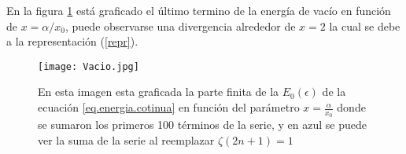 En la figura \ref{fig:vacio} está graficado el último termino de la energía de vacío en función de $x = \alpha / x_0$, puede observarse una divergencia alrededor de $x=2$ la cual se debe a la representación (\ref{repr}).

\begin{figure}
    \centering
    \texttt{[image: Vacio.jpg]}
    \caption{En esta imagen esta graficada la parte finita de la $E _0 (\epsilon) $ de la ecuación \ref{eq.energia.cotinua} en función del parámetro $x= \frac{\alpha}{x _0}$ donde se sumaron los primeros 100 términos de la serie, y en azul se puede ver la suma de la serie al reemplazar $\zeta (2n+1) = 1$}
    \label{fig:vacio}
\end{figure}



